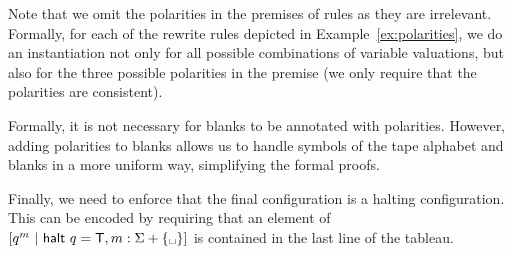 \begin{example}[Polarities]
\begin{center}
  \end{center}
\end{example}

Note that we omit the polarities in the premises of rules as they are irrelevant.
Formally, for each of the rewrite rules depicted in Example~\ref{ex:polarities}, we do an instantiation not only for all possible combinations of variable valuations, but also for the three possible polarities in the premise (we only require that the polarities are consistent).

\begin{remark}
  Formally, it is not necessary for blanks to be annotated with polarities. However, adding polarities to blanks allows us to handle symbols of the tape alphabet and blanks in a more uniform way, simplifying the formal proofs. 
\end{remark}

Finally, we need to enforce that the final configuration is a halting configuration. This can be encoded by requiring that an element of $[q^m~|~\textsf{halt}~q = \btrue, m : \Sigma + \{\blank\}]$ is contained in the last line of the tableau.

